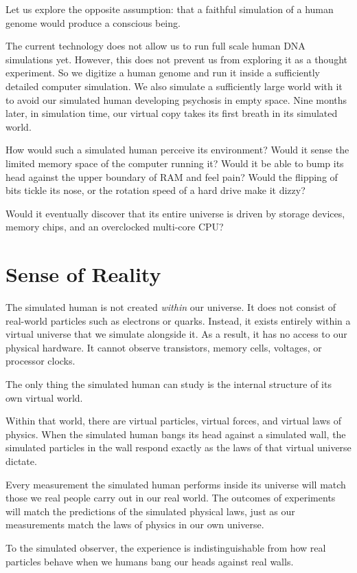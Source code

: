 Let us explore the opposite assumption: that a faithful simulation of a human genome would produce a conscious being.

The current technology does not allow us to run full scale human DNA simulations yet. However, this does not prevent us from exploring it as a thought experiment.
So we digitize a human genome and run it inside a sufficiently 
detailed computer simulation. We also simulate a sufficiently large world with it to avoid our simulated human
developing psychosis in empty space.  Nine months later, in simulation time, our virtual copy takes its first breath 
in its simulated world.

How would such a simulated human perceive its environment? Would it sense the limited memory space of the 
computer running it? Would it be able to bump its head against the upper boundary of RAM and feel pain? 
Would the flipping of bits tickle its nose, or the rotation speed of a hard drive make it dizzy?

Would it eventually discover that its entire universe is driven by storage devices, memory chips, and an 
overclocked multi-core CPU?

\section{Sense of Reality}

The simulated human is not created \emph{within} our universe. It does not consist of real-world particles such 
as electrons or quarks. Instead, it exists entirely within a virtual universe that we simulate alongside it. 
As a result, it has no access to our physical hardware. It cannot observe transistors, memory cells, voltages, 
or processor clocks.

The only thing the simulated human can study is the internal structure of its own virtual world.

Within that world, there are virtual particles, virtual forces, and virtual laws of physics. When the 
simulated human bangs its head against a simulated wall, the simulated particles in the wall respond exactly 
as the laws of that virtual universe dictate.

Every measurement the simulated human performs inside its universe will match those we real people
carry out in our real world.
The outcomes of experiments will match the predictions of the simulated physical laws, just as our 
measurements match the laws of physics in our own universe.

To the simulated observer, the experience is indistinguishable 
from how real particles behave when we humans bang our heads against real walls.

